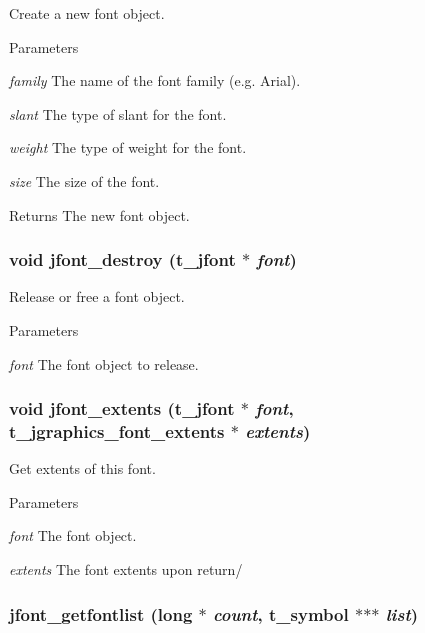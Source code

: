 Create a new font object. 
\begin{DoxyParams}{Parameters}
\item[{\em family}]The name of the font family (e.g. Arial). \item[{\em slant}]The type of slant for the font. \item[{\em weight}]The type of weight for the font. \item[{\em size}]The size of the font. \end{DoxyParams}
\begin{DoxyReturn}{Returns}
The new font object. 
\end{DoxyReturn}
\hypertarget{group__jfont_gaec794a3e2e240f8b759f525c756e7f33}{
\subsubsection[{jfont\_\-destroy}]{\setlength{\rightskip}{0pt plus 5cm}void jfont\_\-destroy ({\bf t\_\-jfont} $\ast$ {\em font})}}
\label{group__jfont_gaec794a3e2e240f8b759f525c756e7f33}


Release or free a font object. 
\begin{DoxyParams}{Parameters}
\item[{\em font}]The font object to release. \end{DoxyParams}
\hypertarget{group__jfont_ga244f386f53aef62b283ff492adc50a73}{
\subsubsection[{jfont\_\-extents}]{\setlength{\rightskip}{0pt plus 5cm}void jfont\_\-extents ({\bf t\_\-jfont} $\ast$ {\em font}, \/  {\bf t\_\-jgraphics\_\-font\_\-extents} $\ast$ {\em extents})}}
\label{group__jfont_ga244f386f53aef62b283ff492adc50a73}


Get extents of this font. 
\begin{DoxyParams}{Parameters}
\item[{\em font}]The font object. \item[{\em extents}]The font extents upon return/ \end{DoxyParams}
\hypertarget{group__jfont_gaa796e25612596182442bc072e457310d}{
\subsubsection[{jfont\_\-getfontlist}]{ jfont\_\-getfontlist (long $\ast$ {\em count}, \/  {\bf t\_\-symbol} $\ast$$\ast$$\ast$ {\em list})}}
\label{group__jfont_gaa796e25612596182442bc072e457310d}


